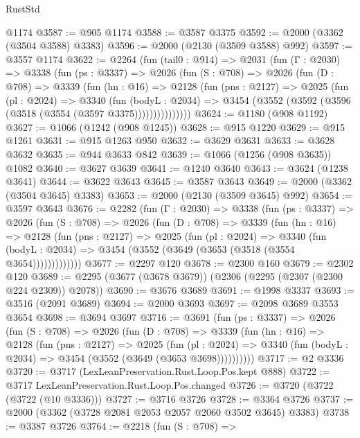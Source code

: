 \begin{lexlean}{RustStd}
\begin{coremodule}
    @1174
@3587 := @905 @1174
@3588 := @3587 @3375
@3592 := @2000 (@3362 (@3504 @3588) @3383)
@3596 := @2000 (@2130 (@3509 @3588) @992)
@3597 := @3557 @1174
@3622 := @2264
    (fun (tail0 : @914) =>
    @2031
      (fun (Γ : @2030) =>
      @3338
        (fun (ps : @3337) =>
        @2026
          (fun (S : @708) =>
          @2026
            (fun (D : @708) =>
            @3339
              (fun (hn : @16) =>
              @2128
                (fun (pns : @2127) =>
                @2025
                  (fun (pl : @2024) =>
                  @3340
                    (fun (bodyL : @2034) =>
                    @3454 (@3552 (@3592 (@3596 (@3518 (@3554 (@3597 @3375)))))))))))))))
@3624 := @1180 (@908 @1192)
@3627 := @1066 (@1242 (@908 @1245))
@3628 := @915 @1220
@3629 := @915 @1261
@3631 := @915 @1263 @950
@3632 := @3629 @3631
@3633 := @3628 @3632
@3635 := @944 @3633 @842
@3639 := @1066 (@1256 (@908 @3635)) @1082
@3640 := @3627 @3639
@3641 := @1240 @3640
@3643 := @3624 (@1238 @3641)
@3644 := @3622 @3643
@3645 := @3587 @3643
@3649 := @2000 (@3362 (@3504 @3645) @3383)
@3653 := @2000 (@2130 (@3509 @3645) @992)
@3654 := @3597 @3643
@3676 := @2282
    (fun (Γ : @2030) =>
    @3338
      (fun (ps : @3337) =>
      @2026
        (fun (S : @708) =>
        @2026
          (fun (D : @708) =>
          @3339
            (fun (hn : @16) =>
            @2128
              (fun (pns : @2127) =>
              @2025
                (fun (pl : @2024) =>
                @3340
                  (fun (bodyL : @2034) =>
                  @3454 (@3552 (@3649 (@3653 (@3518 (@3554 @3654)))))))))))))
@3677 := @2297 @120
@3678 := @2300 @160
@3679 := @2302 @120
@3689 := @2295 (@3677 (@3678 @3679)) (@2306 (@2295 (@2307 (@2300 @224 @2309)) @2078))
@3690 := @3676 @3689
@3691 := @1998 @3337
@3693 := @3516 (@2091 @3689)
@3694 := @2000 @3693
@3697 := @2098 @3689 @3553 @3654
@3698 := @3694 @3697
@3716 := @3691
    (fun (ps : @3337) =>
    @2026
      (fun (S : @708) =>
      @2026
        (fun (D : @708) =>
        @3339
          (fun (hn : @16) =>
          @2128
            (fun (pns : @2127) =>
            @2025
              (fun (pl : @2024) =>
              @3340 (fun (bodyL : @2034) => @3454 (@3552 (@3649 (@3653 @3698))))))))))
@3717 := @2 @3336
@3720 := @3717 (LexLeanPreservation.Rust.Loop.Pos.kept @888)
@3722 := @3717 LexLeanPreservation.Rust.Loop.Pos.changed
@3726 := @3720 (@3722 (@3722 (@10 @3336)))
@3727 := @3716 @3726
@3728 := @3364 @3726
@3737 := @2000 (@3362 (@3728 @2081 @2053 @2057 @2060 @3502 @3645) @3383)
@3738 := @3387 @3726
@3764 := @2218
    (fun (S : @708) =>

\end{coremodule}
\end{lexlean}
